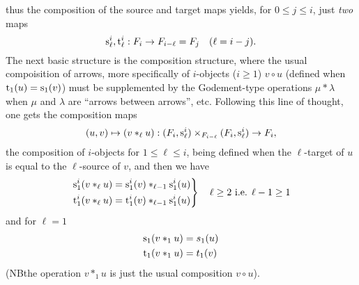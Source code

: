 thus the composition of the source and target maps yields, for $0\le
j\le i$, just \emph{two} maps
\begin{equation*}
  \mathrm{s}_\ell^i, \mathrm{t}_\ell^i : F_i \to F_{i-\ell} = F_j \quad (\ell = i-j).
\end{equation*}
The next basic structure is the composition structure, where the
usual compoisition of arrows, more specifically of $i$-objects
($i\ge1$) $v \circ u$ (defined when $\mathrm{t}_1(u)=\mathrm{s}_1(v)$) must be
supplemented by the Godement-type operations $\mu * \lambda$ when
$\mu$ and $\lambda$ are ``arrows between arrows'', etc. Following this
line of thought, one gets the composition maps
\begin{equation*}
  (u,v) \mapsto (v *_\ell u) : (F_i, \mathrm{s}_\ell^i) \times_{F_{i-\ell}}
  (F_i,\mathrm{s}_\ell^i) \to F_i,
\end{equation*}
the composition of $i$-objects for $1\le \ell\le i$, being defined
when the $\ell$-target of $u$ is equal to the $\ell$-source of $v$,
and then we have
\begin{equation*}
  \left.\begin{aligned}
    \mathrm{s}_1^i(v *_\ell u) &=  \mathrm{s}_1^i(v) *_{\ell-1} \mathrm{s}_1^i(u) \\
    \mathrm{t}_1^i(v *_\ell u) &=  \mathrm{t}_1^i(v) *_{\ell-1} \mathrm{s}_1^i(u)
    \end{aligned}\right\}
  \quad \text{$\ell\ge2$ i.e. $\ell-1\ge1$}
\end{equation*}
and for $\ell=1$
\begin{align*}
  \mathrm{s}_1(v *_1 u) &= s_1(u) \\
  \mathrm{t}_1(v *_1 u) &= t_1(v)
\end{align*}
(NB\enspace the operation $v *_1 u$ is just the usual composition $v \circ
u$).


